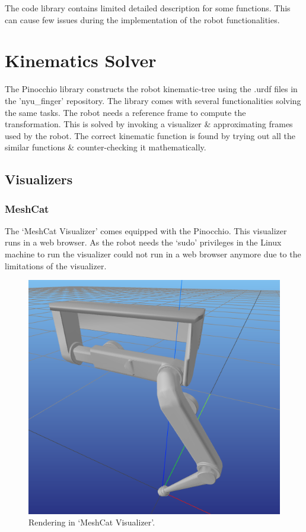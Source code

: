 \documentclass[12pt]{article}
\begin{document}
        The code library contains limited detailed description for some functions. This can cause few issues during the implementation of the robot functionalities.
        \pagebreak

\section{Kinematics Solver}
    The Pinocchio library constructs the robot kinematic-tree using the .urdf files in the 'nyu\_finger' repository. 
    The library comes with several functionalities solving the same tasks. The robot needs a reference frame to compute the transformation. 
    This is solved by invoking a visualizer \& approximating frames used by the robot. The correct kinematic function is found by trying out all the similar functions \& counter-checking it mathematically.   

    \subsection{Visualizers}
        \subsubsection{MeshCat}
            The `MeshCat Visualizer' comes equipped with the Pinocchio. This visualizer runs in a web browser. 
            As the robot needs the `sudo' privileges in the Linux machine to run the visualizer could not run in a web browser anymore due to the limitations of the visualizer.
            \begin{figure}[h]
                \centering
                \includegraphics[scale=0.27]{meshcat.png}
                \caption{Rendering in `MeshCat Visualizer'.}
            \end{figure}
\end{document}

